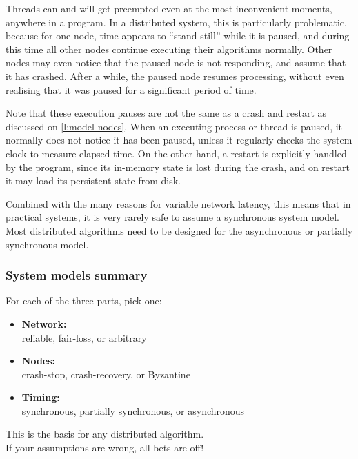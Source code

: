 Threads can and will get preempted even at the most inconvenient moments, anywhere in a program.
In a distributed system, this is particularly problematic, because for one node, time appears to ``stand still'' while it is paused, and during this time all other nodes continue executing their algorithms normally.
Other nodes may even notice that the paused node is not responding, and assume that it has crashed.
After a while, the paused node resumes processing, without even realising that it was paused for a significant period of time.

Note that these execution pauses are not the same as a crash and restart as discussed on \autoref{l:model-nodes}.
When an executing process or thread is paused, it normally does not notice it has been paused, unless it regularly checks the system clock to measure elapsed time.
On the other hand, a restart is explicitly handled by the program, since its in-memory state is lost during the crash, and on restart it may load its persistent state from disk.

Combined with the many reasons for variable network latency, this means that in practical systems, it is very rarely safe to assume a synchronous system model.
Most distributed algorithms need to be designed for the asynchronous or partially synchronous model.

\begin{frame}
    \label{s:model-summary}
    \frametitle{System models summary}
    For each of the three parts, pick one:\\
    \begin{itemize}
        \item \textbf{Network:}\\
            reliable, fair-loss, or arbitrary\\[1em]
        \item \textbf{Nodes:}\\
            crash-stop, crash-recovery, or Byzantine\\[1em]
        \item \textbf{Timing:}\\
            synchronous, partially synchronous, or asynchronous\\[1em]
    \end{itemize}
    This is the basis for any distributed algorithm.\\
    If your assumptions are wrong, all bets are off!
\end{frame}
\label{l:model-summary}

